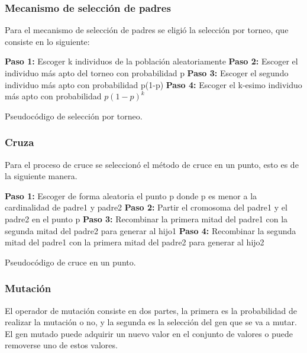 \subsubsection{Mecanismo de selección de padres}

Para el mecanismo de selección de padres se eligió la selección por torneo, que consiste en lo siguiente:

\begin{algorithm}[H] 
	\SetAlgoLined
	\textbf{Paso 1:} Escoger k individuos de la población aleatoriamente\;
	\textbf{Paso 2:} Escoger el individuo más apto del torneo con probabilidad p\;
	\textbf{Paso 3:} Escoger el segundo individuo más apto con probabilidad p(1-p) \;
	\textbf{Paso 4:} Escoger el k-esimo individuo más apto con probabilidad $p(1-p)^k$ \;
	\caption{Pseudocódigo de selección por torneo.}
\end{algorithm}

\subsubsection{Cruza}

Para el proceso de cruce se seleccionó el método de cruce en un punto, esto es de la siguiente manera.
\\
\begin{algorithm}[H] 
	\SetAlgoLined
	\textbf{Paso 1:} Escoger de forma aleatoria el punto p donde p es menor a la cardinalidad de padre1 y padre2\;
	\textbf{Paso 2:} Partir el cromosoma del padre1 y el padre2 en el punto p\;
	\textbf{Paso 3:} Recombinar la primera mitad del padre1 con la segunda mitad del padre2 para generar al hijo1\;
	\textbf{Paso 4:} Recombinar la segunda mitad del padre1 con la primera mitad del padre2 para generar al hijo2\;
	\caption{Pseudocódigo de cruce en un punto.}
\end{algorithm}

\subsubsection{Mutación}

El operador de mutación consiste en dos partes, la primera es la probabilidad de realizar la mutación o no, y la segunda es la selección del gen que se va a mutar. El gen mutado puede adquirir un nuevo valor en el conjunto de valores o puede removerse uno de estos valores.

